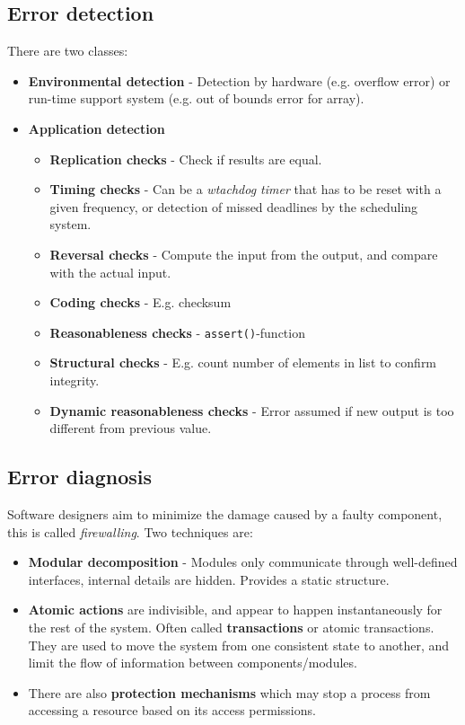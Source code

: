 \subsection{Error detection}\label{sec:error_detection}
There are two classes:
\begin{itemize}
    \item \textbf{Environmental detection} - Detection by hardware (e.g. overflow error) or run-time support system (e.g. out of bounds error for array).
    \item \textbf{Application detection}
    \begin{itemize}
        \item \textbf{Replication checks} - Check if results are equal.
        \item \textbf{Timing checks} - Can be a \emph{wtachdog timer} that has to be reset with a given frequency, or detection of missed deadlines by the scheduling system.
        \item \textbf{Reversal checks} - Compute the input from the output, and compare with the actual input.
        \item \textbf{Coding checks} - E.g. checksum
        \item \textbf{Reasonableness checks} - \texttt{assert()}-function
        \item \textbf{Structural checks} - E.g. count number of elements in list to confirm integrity.
        \item \textbf{Dynamic reasonableness checks} - Error assumed if new output is too different from previous value.
    \end{itemize}
\end{itemize}

\subsection{Error diagnosis}
Software designers aim to minimize the damage caused by a faulty component, this is called \emph{firewalling}. Two techniques are: 
\begin{itemize}
    \item \textbf{Modular decomposition} - Modules only communicate through well-defined interfaces, internal details are hidden. Provides a static structure.
    \item \textbf{Atomic actions} are indivisible, and appear to happen instantaneously for the rest of the system. Often called \textbf{transactions} or atomic transactions. They are used to move the system from one consistent state to another, and limit the flow of information between components/modules.
    \item There are also \textbf{protection mechanisms} which may stop a process from accessing a resource based on its access permissions.
\end{itemize}


